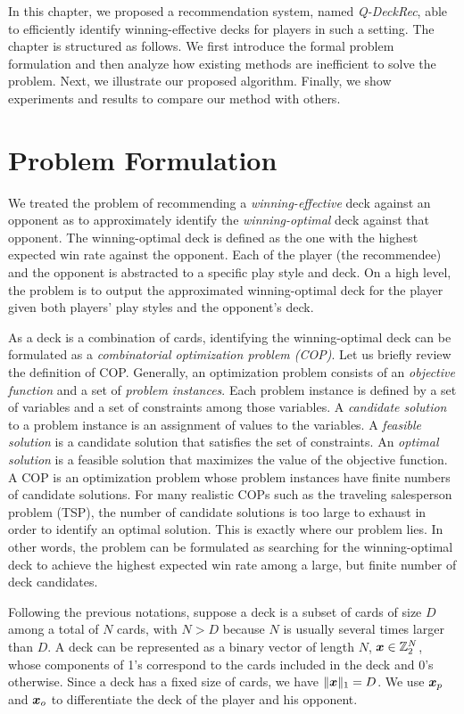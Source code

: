 In this chapter, we proposed a recommendation system, named \textit{Q-DeckRec}, able to efficiently identify winning-effective decks for players in such a setting. The chapter is structured as follows. We first introduce the formal problem formulation and then analyze how existing methods are inefficient to solve the problem. Next, we illustrate our proposed algorithm. Finally, we show experiments and results to compare our method with others.

 
 \section{Problem Formulation}\label{sec:qdeckrec_probform}
We treated the problem of recommending a \textit{winning-effective} deck against an opponent as to approximately identify the \textit{winning-optimal} deck against that opponent. The winning-optimal deck is defined as the one with the highest expected win rate against the opponent. Each of the player (the recommendee) and the opponent is abstracted to a specific play style and deck. On a high level, the problem is to output the approximated winning-optimal deck for the player given both players' play styles and the opponent's deck.

As a deck is a combination of cards, identifying the winning-optimal deck can be formulated as a \textit{combinatorial optimization problem (COP)}. Let us briefly review the definition of COP. Generally, an optimization problem consists of an \textit{objective function} and a set of \textit{problem instances}. Each problem instance is defined by a set of variables and a set of constraints among those variables. A \textit{candidate solution} to a problem instance is an assignment of values to the variables. A \textit{feasible solution} is a candidate solution that satisfies the set of constraints. An \textit{optimal solution} is a feasible solution that maximizes the value of the objective function. A COP is an optimization problem whose problem instances have finite numbers of candidate solutions. For many realistic COPs such as the traveling salesperson problem (TSP), the number of candidate solutions is too large to exhaust in order to identify an optimal solution. This is exactly where our problem lies. In other words, the problem can be formulated as searching for the winning-optimal deck to achieve the highest expected win rate among a large, but finite number of deck candidates.

Following the previous notations, suppose a deck is a subset of cards of size $D$ among a total of $N$ cards, with $N > D$ because $N$ is usually several times larger than $D$. A deck can be represented as a binary vector of length $N$, $ \boldsymbol{x} \in \mathbb{Z}_2^N$, whose components of 1's correspond to the cards included in the deck and 0's otherwise. Since a deck has a fixed size of cards, we have $\|\boldsymbol{x}\|_1=D$. We use $\boldsymbol{x}_p$ and $\boldsymbol{x}_o$ to differentiate the deck of the player and his opponent. 

